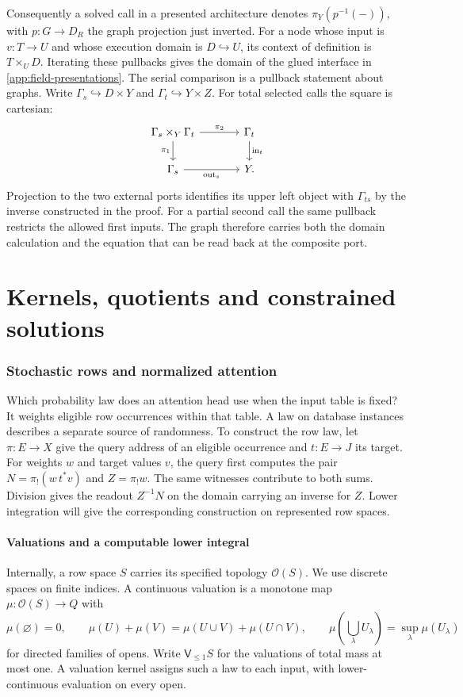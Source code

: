 \documentclass[11pt,a4paper]{article}
\theoremstyle{definition}
\theoremstyle{remark}\newaliascnt{remark}{theorem}
\newcommand{\V}{\mathsf V_{\le1}}
\numberwithin{equation}{section}
\begin{document}
Consequently a solved call in a presented architecture denotes \(\pi_Y(p^{-1}(-))\), with $p:G\to D_R$ the graph projection just inverted. For a node whose input is \(v:T\to U\) and whose execution domain is \(D\hookrightarrow U\), its context of definition is \(T\times_U D\). Iterating these pullbacks gives the domain of the glued interface in \cref{app:field-presentations}.
The serial comparison is a pullback statement about graphs. Write \(\Gamma_s\hookrightarrow D\times Y\) and \(\Gamma_t\hookrightarrow Y\times Z\). For total selected calls the square is cartesian:
\[
\begin{tikzcd}[column sep=large]
 \Gamma_s\times_Y\Gamma_t\arrow[r,"\pi_2"]\arrow[d,"\pi_1"']&
 \Gamma_t\arrow[d,"\mathrm{in}_t"]\\
 \Gamma_s\arrow[r,"\mathrm{out}_s"']&Y .
\end{tikzcd}
\]
Projection to the two external ports identifies its upper left object with \(\Gamma_{ts}\) by the inverse constructed in the proof. For a partial second call the same pullback restricts the allowed first inputs. The graph therefore carries both the domain calculation and the equation that can be read back at the composite port.

\clearpage
\part{Kernels, quotients and constrained solutions}\label{part:solutions}

\section{Stochastic rows and normalized attention}\label{sec:sto}

Which probability law does an attention head use when the input table is fixed? It weights eligible row occurrences within that table. A law on database instances describes a separate source of randomness. To construct the row law, let $\pi:E\to X$ give the query address of an eligible occurrence and $t:E\to J$ its target. For weights $w$ and target values $v$, the query first computes the pair $N=\pi_!(w\,t^*v)$ and $Z=\pi_!w$. The same witnesses contribute to both sums. Division gives the readout $Z^{-1}N$ on the domain carrying an inverse for $Z$. Lower integration will give the corresponding construction on represented row spaces.

\subsection{Valuations and a computable lower integral}
Internally, a row space \(S\) carries its specified topology \(\mathcal O(S)\). We use discrete spaces on finite indices. A continuous valuation is a monotone map \(\mu:\mathcal O(S)\to Q\) with
\[
 \mu(\varnothing)=0,\qquad
 \mu(U)+\mu(V)=\mu(U\cup V)+\mu(U\cap V),\qquad
 \mu(\bigcup_\lambda U_\lambda)=\sup_\lambda\mu(U_\lambda)
\]
for directed families of opens. Write $\V S$ for the valuations of total mass at most one. A valuation kernel assigns such a law to each input, with lower-continuous evaluation on every open.
\end{document}
